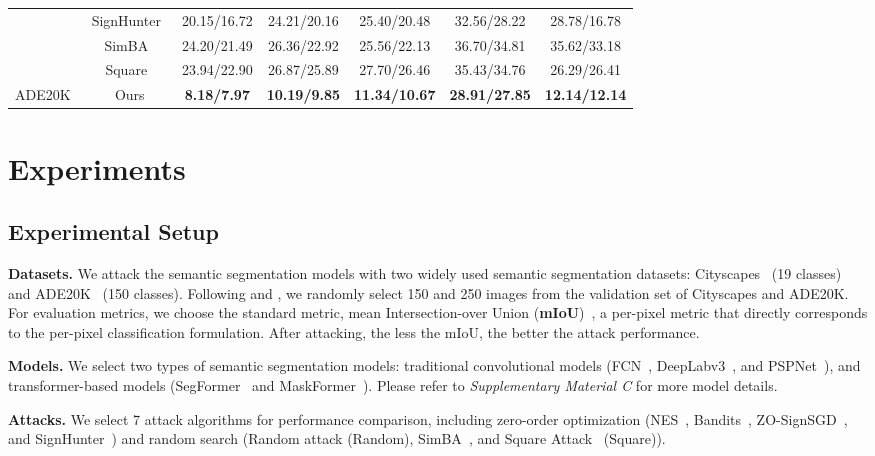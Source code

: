 \documentclass[10pt,twocolumn,letterpaper]{article}
\begin{document}
\begin{table}[t]
\begin{center}
{\begin{tabular}{@{}ccccccc@{}}
 & SignHunter~\cite{signhunter} & 20.15/16.72 & 24.21/20.16 & 25.40/20.48 & 32.56/28.22 & 28.78/16.78 \\
 & SimBA~\cite{simba} & 24.20/21.49 & 26.36/22.92 & 25.56/22.13 & 36.70/34.81 & 35.62/33.18 \\
 & Square~\cite{square} & 23.94/22.90 & 26.87/25.89 & 27.70/26.46 & 35.43/34.76 & 26.29/26.41 \\
\multirow{-9}{*}{ADE20K~\cite{ade20k}} & Ours & \textbf{8.18/7.97} & \textbf{10.19/9.85} & \textbf{11.34/10.67} & \textbf{28.91/27.85} & \textbf{12.14/12.14} \\ \bottomrule
\end{tabular}
}
\end{center}
\vspace{-8pt}
\end{table}

\section{Experiments}
\label{sec:expriments}

\subsection{Experimental Setup}

\textbf{Datasets.} We attack the semantic segmentation models with two widely used semantic segmentation datasets: Cityscapes~\cite{cityscapes} (19 classes) and ADE20K~\cite{ade20k} (150 classes). Following \cite{indirect} and \cite{segpgd}, we randomly select 150 and 250 images from the validation set of Cityscapes and ADE20K. For evaluation metrics, we choose the standard metric, mean Intersection-over Union (\textbf{mIoU})~\cite{pascal}, a per-pixel metric that directly corresponds to the per-pixel classification formulation. After attacking, the less the mIoU, the better the attack performance.

\noindent\textbf{Models.} We select two types of semantic segmentation models: traditional convolutional models (FCN~\cite{fcn}, DeepLabv3~\cite{deeplabv3}, and PSPNet~\cite{pspnet}), and transformer-based models (SegFormer~\cite{segformer} and MaskFormer~\cite{maskformer}). Please refer to \textit{Supplementary Material C} for more model details.

\noindent\textbf{Attacks.} We select 7 attack algorithms for performance comparison, including zero-order optimization (NES~\cite{nes}, Bandits~\cite{bandits}, ZO-SignSGD~\cite{zosignpgd}, and SignHunter~\cite{signhunter}) and random search (Random attack (Random), SimBA~\cite{simba}, and Square Attack~\cite{square} (Square)). 
\end{document}
